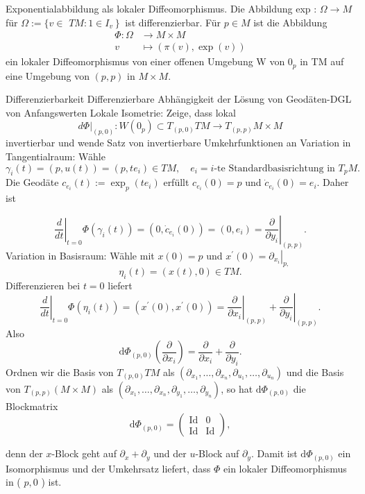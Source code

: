 \documentclass[10pt, letterpaper]{article}
\begin{document}
\begin{StmtStruct}
{Exponentialabbildung als lokaler Diffeomorphismus. Die Abbildung exp : $\Omega \rightarrow M$ für $\Omega:=\{v \in$ $\left.T M: 1 \in I_{v}\right\}$ ist differenzierbar. Für $p \in M$ ist die Abbildung
$$
\begin{aligned}
\Phi: \Omega & \rightarrow M \times M \\
v & \mapsto(\pi(v), \exp (v))
\end{aligned}
$$
ein lokaler Diffeomorphismus von einer offenen Umgebung W von $0_{p}$ in TM auf eine Umgebung von $(p, p)$ in $M \times M$.}
{
\begin{outline}
    \1 Differenzierbarkeit
        \2 Differenzierbare Abhängigkeit der Lösung von Geodäten-DGL von Anfangswerten
    \1 Lokale Isometrie: Zeige, dass lokal 
    $$d\Phi|_{(p,0)}: W(0_p)\subset T_{(p,0)}TM\to T_{(p,p)}M\times M$$ 
    invertierbar und wende Satz von invertierbare Umkehrfunktionen an
        \2 Variation in Tangentialraum: Wähle  
        $$
        \gamma_i(t)=(p, u(t))=\left(p, t e_i\right) \in T M, \quad e_i=i \text {-te Standardbasisrichtung in } T_p M .
        $$
        Die Geodäte $c_{e_i}(t):=\exp _p\left(t e_i\right)$ erfüllt $c_{e_i}(0)=p$ und $\dot{c}_{e_i}(0)=e_i$. Daher ist

        $$
        \left.\frac{d}{d t}\right|_{t=0} \Phi\left(\gamma_i(t)\right)=\left(0, \dot{c}_{e_i}(0)\right)=\left(0, e_i\right)=\left.\frac{\partial}{\partial y_i}\right|_{(p, p)} .
        $$
        \2 Variation in Basisraum: Wähle mit $x(0)=p$ und $x^{\prime}(0)=\left.\partial_{x_i}\right|_{p,}$
        $$
        \eta_i(t)=(x(t), 0) \in T M .
        $$
        Differenzieren bei $t=0$ liefert
        $$
        \left.\frac{d}{d t}\right|_{t=0} \Phi\left(\eta_i(t)\right)=\left(x^{\prime}(0), x^{\prime}(0)\right)=\left.\frac{\partial}{\partial x_i}\right|_{(p, p)}+\left.\frac{\partial}{\partial y_i}\right|_{(p, p)} .
        $$
        Also
        $$
        \mathrm{d} \Phi_{(p, 0)}\left(\frac{\partial}{\partial x_i}\right)=\frac{\partial}{\partial x_i}+\frac{\partial}{\partial y_i} .
        $$
        \2 Ordnen wir die Basis von $T_{(p, 0)} T M$ als $\left(\partial_{x_1}, \ldots, \partial_{x_n}, \partial_{u_1}, \ldots, \partial_{u_n}\right)$ und die Basis von $T_{(p, p)}(M \times M)$ als $\left(\partial_{x_1}, \ldots, \partial_{x_n}, \partial_{y_1}, \ldots, \partial_{y_n}\right)$, so hat $\mathrm{d} \Phi_{(p, 0)}$ die Blockmatrix
        $$
        \mathrm{d} \Phi_{(p, 0)}=\left(\begin{array}{cc}
        \mathrm{Id} & 0 \\
        \mathrm{Id} & \mathrm{Id}
        \end{array}\right),
        $$

        denn der $x$-Block geht auf $\partial_x+\partial_y$ und der $u$-Block auf $\partial_y$.
        \2 Damit ist $\mathrm{d} \Phi_{(p, 0)}$ ein Isomorphismus und der Umkehrsatz liefert, dass $\Phi$ ein lokaler Diffeomorphismus in ( $p, 0$ ) ist.
  \end{outline}
}
\end{StmtStruct}
\end{document}
